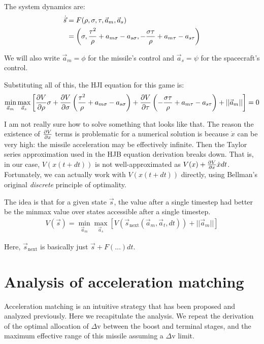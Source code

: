 \documentclass{article}
\begin{document}
The system dynamics are:
\begin{align}
\dot{\vec{s}}
&= F(\rho, \sigma, \tau, \vec{a}_m, \vec{a}_s) \notag \\
&= \left(\sigma,
  \frac{\tau^2}{\rho} + a_{m\sigma} - a_{s\sigma},
  -\frac{\sigma\tau}{\rho} + a_{m\tau} - a_{s\tau}\right)
\end{align}

We will also write $\vec{a}_m = \phi$ for the missile's control and $\vec{a}_s =
\psi$ for the spacecraft's control.

Substituting all of this, the HJI equation for this game is:
\begin{align}
\min_{\vec{a}_m} \max_{\vec{a}_s} \left[
  \pdv{V}{\rho} \sigma
+ \pdv{V}{\sigma} \left(\frac{\tau^2}{\rho} + a_{m\sigma} - a_{s\sigma}\right)
+ \pdv{V}{\tau} \left(-\frac{\sigma\tau}{\rho} + a_{m\tau} - a_{s\tau}\right)
+ ||\vec{a}_m||
\right] = 0
\end{align}

I am not really sure how to solve something that looks like that.
The reason the existence of $\pdv{V}{x}$ terms is problematic for a numerical
solution is because $\dot{x}$ can be very high: the missile acceleration may be
effectively infinite.
Then the Taylor series approximation used in the HJB equation derivation breaks
down.
That is, in our case, $V(x(t + dt))$ is not well-approximated as $V(x) +
\pdv{V}{x} \dot{x} dt$.
Fortunately, we can actually work with $V(x(t + dt))$ directly, using Bellman's
original \textit{discrete} principle of optimality.

The idea is that for a given state $\vec{s}$, the value after a single timestep
had better be the minmax value over states accessible after a single timestep.
\begin{align}
V(\vec{s}) = \min_{\vec{a}_m} \max_{\vec{a}_s} \left[
  V(\vec{s}_\text{next}(\vec{a}_m, \vec{a}_t, dt)) +
  ||\vec{a}_m||
\right]
\end{align}

Here, $\vec{s}_\text{next}$ is basically just $\vec{s} + F(\dots) dt$.

\section{Analysis of acceleration matching}

Acceleration matching is an intuitive strategy that has been proposed and
analyzed previously. Here we recapitulate the analysis. We repeat the derivation
of the optimal allocation of $\Delta$v between the boost and terminal stages,
and the maximum effective range of this missile assuming a $\Delta$v limit.
\end{document}

